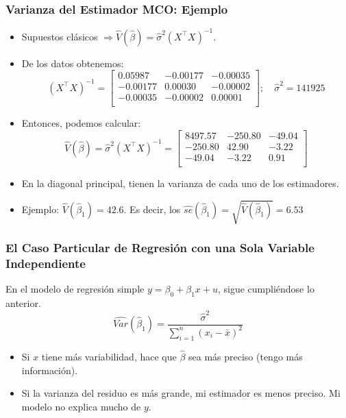 \documentclass{beamer}
\begin{document}
 \begin{frame}
 \frametitle{Varianza del Estimador MCO: Ejemplo}
\begin{itemize}
    \item Supuestos clásicos $\Rightarrow \hat{V}(\hat{\beta}) = \hat{\sigma}^2(X^{\top}X)^{-1}$.
    \item De los datos obtenemos:
    \[
    (X^{\top}X)^{-1} =
    \begin{bmatrix}
    0.05987 & -0.00177 & -0.00035 \\
    -0.00177 & 0.00030 & -0.00002 \\
    -0.00035 & -0.00002 & 0.00001 \\
    \end{bmatrix}; \quad \hat{\sigma}^2 = 141925
    \]
    \item Entonces, podemos calcular:
    \[
    \hat{V}(\hat{\beta}) = \hat{\sigma}^2(X^{\top}X)^{-1} =
    \begin{bmatrix}
    8497.57 & -250.80 & -49.04 \\
    -250.80 & 42.90 & -3.22 \\
    -49.04 & -3.22 & 0.91 \\
    \end{bmatrix}
    \]
    \item En la diagonal principal, tienen la varianza de cada uno de los estimadores.
      \item Ejemplo: $\hat{V}(\hat{\beta}_1) = 42.6$. Es decir, los $\hat{se}(\hat{\beta}_1) = \sqrt{\hat{V}(\hat{\beta}_1)} = 6.53$
\end{itemize}
\end{frame}

\begin{frame}
\frametitle{El Caso Particular de Regresión con una Sola Variable Independiente}
En el modelo de regresión simple $y = \beta_0 + \beta_1 x + u$, sigue cumpliéndose lo anterior.
\[
\hat{Var}(\hat{\beta}_1) = {\frac{{\hat{\sigma}}^2}{\sum_{i=1}^{n}(x_i - \bar{x})^2}}
\]
\begin{itemize}
    \item Si $x$ tiene más variabilidad, hace que $\hat{\beta}$ sea más preciso (tengo más información).
    \item Si la varianza del residuo es más grande, mi estimador es menos preciso. Mi modelo no explica mucho de $y$.
\end{itemize}
 \end{frame}
\end{document}
